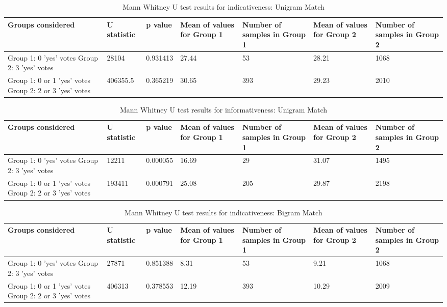 \begin{table}[!htbp]
\caption{Mann Whitney U test results for indicativeness: Unigram Match}
\centering
\label{tab:unicorr1}
\begin{tabular}{|p{}|p{}|p{}|p{}|p{}|p{}|p{}|}
\hline
Groups considered    & U statistic & p value & Mean of values for Group 1 & Number of samples in Group 1 & Mean of values for Group 2 & Number of samples in Group 2\\ \hline
Group 1: 0 'yes' votes \newline Group 2: 3 'yes' votes &  28104  &  0.931413  &  27.44  & 53 & 28.21 &   1068  \\ \hline
Group 1: 0 or 1 'yes' votes \newline Group 2: 2 or 3 'yes' votes &   406355.5  & 0.365219 & 30.65  & 393 & 29.23 & 2010 \\ \hline
\end{tabular}
\end{table}

\begin{table}[!htbp]
\caption{Mann Whitney U test results for informativeness: Unigram Match}
\centering
\label{tab:unicorr2}
\begin{tabular}{|p{}|p{}|p{}|p{}|p{}|p{}|p{}|}
\hline
Groups considered    & U statistic & p value & Mean of values for Group 1 & Number of samples in Group 1 & Mean of values for Group 2 & Number of samples in Group 2\\ \hline
Group 1: 0 'yes' votes \newline Group 2: 3 'yes' votes & 12211 & 0.000055  & 16.69 & 29 & 31.07 & 1495  \\ \hline
Group 1: 0 or 1 'yes' votes \newline Group 2: 2 or 3 'yes' votes & 193411 & 0.000791 & 25.08 & 205 & 29.87 & 2198 \\ \hline
\end{tabular}
\end{table}

\begin{table}[!htbp]
\caption{Mann Whitney U test results for indicativeness: Bigram Match}
\centering
\label{tab:bicorr1}
\begin{tabular}{|p{}|p{}|p{}|p{}|p{}|p{}|p{}|}
\hline
Groups considered    & U statistic & p value & Mean of values for Group 1 & Number of samples in Group 1 & Mean of values for Group 2 & Number of samples in Group 2\\ \hline
Group 1: 0 'yes' votes \newline Group 2: 3 'yes' votes & 27871 & 0.851388 & 8.31 & 53 & 9.21 & 1068  \\ \hline
Group 1: 0 or 1 'yes' votes \newline Group 2: 2 or 3 'yes' votes& 406313 & 0.378553 & 12.19 & 393 & 10.29 & 2009 \\ \hline
\end{tabular}
\end{table}


